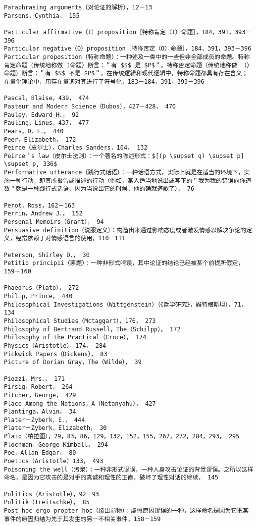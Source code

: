\begin{verbatim}
Paraphrasing arguments（对论证的解析），12－13
Parsons，Cynthia， 155

Particular affirmative（I）proposition［特称肯定（I）命题］，184，391，393－396
Particular negative（O）proposition［特称否定（O）命题］，184，391，393－396
Particular proposition（特称命题）：一种述及一类中的一些但非全部成员的命题。特称肯定命题（传统地称做 I命题）断言：＂有 $S$ 是 $P$＂。特称否定命题（传统地称做 （）命题）断言：＂有 $S$ 不是 $P$＂。在传统逻緝和现代逻辑中，特称命题都具有存在含义；在量化理论中，用存在量词对其进行了符号化，183－184，391，393－396

Pascal，Blaise，439， 474
Pasteur and Modern Science（Dubos），427－428， 470
Pauley，Edward H．， 92
Pauling，Linus，437， 477
Pears，D．F．， 440
Peer，Elizabeth， 172
Peirce（皮尔士），Charles Sanders，104， 132
Peirce＇s law（皮尔士法则）：一个著名的陈述形式：$[(p \supset q) \supset p] \supset p, 336$
Performative utterance（践行式话语）：一种话语方式，实际上就是在适当的环境下，实施一种行动，即其所报告或描述的行动（例如，某人适当地说出或写下的＂我为我的错误向你道数＂就是一种践行式话语，因为当说出它的时候，他的确就道歉了）， 76

Perot，Ross，162－163
Perrin，Andrew J．， 152
Personal Memoirs（Grant）， 94
Persuasive definition（说服定义）：构造出来通过影响态度或者激发情感以解决争论的定义，经常依赖于对情感语言的使用，110－111

Peterson，Shirley D．， 30
Petitio principii（罞题）：一种非形式呺误，其中论证的结论已经被某个前提所假定， 159－160

Phaedrus（Plato）， 272
Philip，Prince， 440
Philosophical Investigations（Wittgenstein）（《哲学研究》，維特根斯坦），71，134
Philosophical Studies（Mctaggart），176， 273
Philosophy of Bertrand Russell，The（Schilpp）， 172
Philosophy of the Practical（Croce）， 174
Physics（Aristotle），174， 284
Pickwick Papers（Dickens）， 83
Picture of Dorian Gray，The（Wilde）， 39

Piozzi，Mrs．， 171
Pirsig，Robert， 264
Pitcher，George， 429
Place Among the Nations，A（Netanyahu）， 427
Plantinga，Alvin， 34
Plater－Zyberk，E．， 444
Plater－Zyberk，Elizabeth， 30
Plato（柏拉图），29，83，86，129，132，152，155，267，272，284，293， 295
Plochman，George Kimball， 294
Poe，Allan Edgar， 80
Poetics（Aristotle）133， 493
Poisoning the well（污泉）：一种非形式谬误，一种人身攻击论证的背景谬误。之所以这样命名，是因为它攻击的是对手的真诚和理性的正直，破坏了理性对话的继续， 145

Politics（Aristotle），92－93
Politik（Treitschke）， 85
Post hoc ergo propter hoc（缘出前物）：虚假原因谬误的一种，这样命名是因为它把某事件的原因归结为先于其发生的另一不相关事件，158－159


\end{verbatim}
